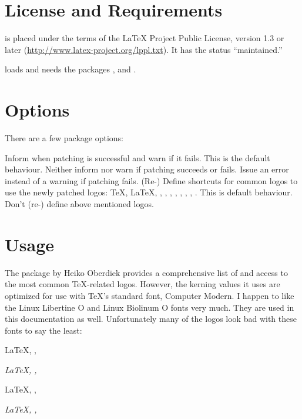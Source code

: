 \documentclass{cnpkgdoc}
\begin{document}
\section{License and Requirements}
\lbthlpt is placed under the terms of the \LaTeX{} Project Public License,
version 1.3 or later (\url{http://www.latex-project.org/lppl.txt}). It has the
status ``maintained.''

\lbthlpt loads and needs the packages ,  and
.

\section{Options}
There are a few package options:
\begin{beschreibung}
 \newline
   Inform when patching is successful and warn if it fails. This is the default
   behaviour.
 \newline
   Neither inform nor warn if patching succeeds or fails.
 \newline
   Issue an error instead of a warning if patching fails.
 \newline
   (Re-) Define shortcuts for common logos to use the newly patched 
   logos:  \TeX,  \LaTeX,  \LaTeXe, 
   \LaTeXTeX,  \pdfTeX,  \pdfLaTeX,  \XeTeX,
    \XeLaTeX,  \LuaTeX,  \LuaLaTeX. This
   is default behaviour.
 \newline
   Don't (re-) define above mentioned logos.
\end{beschreibung}

\section{Usage}
The  package by Heiko Oberdiek provides a comprehensive list of and
access to the most common \TeX-related logos. However, the kerning values it uses
are optimized for use with \TeX's standard font, Computer Modern. I happen to
like the Linux Libertine O and Linux Biolinum O fonts very much. They are used
in this documentation as well. Unfortunately many of the logos look bad with these
fonts to say the least:

\begin{beispiel}
 \restorelogos\huge
 \LaTeX, \XeLaTeX, \LaTeXTeX \par
 \textit{\LaTeX, \XeLaTeX, \LaTeXTeX}
 
 \sffamily
 \LaTeX, \XeLaTeX, \LaTeXTeX \par
 \textit{\LaTeX, \XeLaTeX, \LaTeXTeX}
\end{beispiel}
\end{document}
